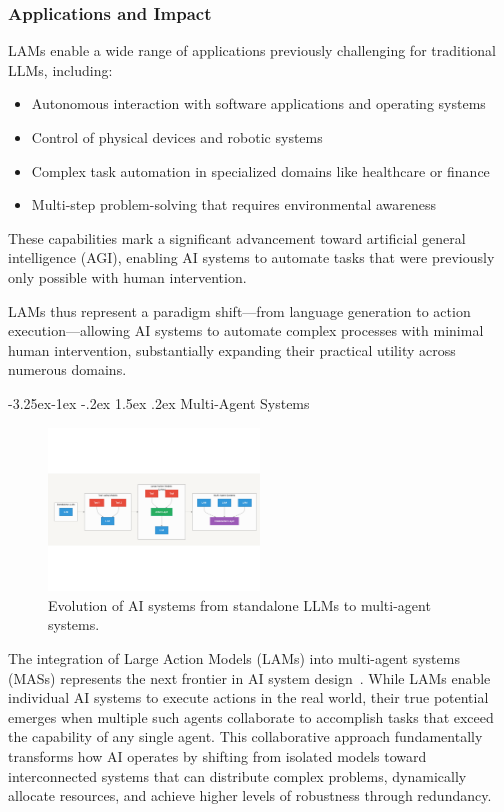 \documentclass[journal,twoside,10pt]{IEEEtran}
\makeatletter
\renewcommand\subsection{\@startsection{subsection}{2}{\z@}%
                       {-3.25ex\@plus -1ex \@minus -.2ex}%
                       {1.5ex \@plus .2ex}%
                       {\normalfont\large\bfseries}}
\makeatother
\begin{document}
\subsubsection{Applications and Impact}
LAMs enable a wide range of applications previously challenging for traditional LLMs, including:

\begin{itemize}
    \item Autonomous interaction with software applications and operating systems
    \item Control of physical devices and robotic systems
    \item Complex task automation in specialized domains like healthcare or finance
    \item Multi-step problem-solving that requires environmental awareness
\end{itemize}

These capabilities mark a significant advancement toward artificial general intelligence (AGI), enabling AI systems to automate tasks that were previously only possible with human intervention.

LAMs thus represent a paradigm shift—from language generation to action execution—allowing AI systems to automate complex processes with minimal human intervention, substantially expanding their practical utility across numerous domains.

\subsection{Multi-Agent Systems}

\begin{figure}[htbp]
    \centering
    \includegraphics[width=0.5\textwidth, trim=0 150pt 0 150pt, clip]{lams_diagram.pdf}
    \caption{Evolution of AI systems from standalone LLMs to multi-agent systems.}
    \label{fig:lam-evolution}
\end{figure}

The integration of Large Action Models (LAMs) into multi-agent systems (MASs) represents the next frontier in AI system design~\cite{tran2025multiagent}. While LAMs enable individual AI systems to execute actions in the real world, their true potential emerges when multiple such agents collaborate to accomplish tasks that exceed the capability of any single agent. This collaborative approach fundamentally transforms how AI operates by shifting from isolated models toward interconnected systems that can distribute complex problems, dynamically allocate resources, and achieve higher levels of robustness through redundancy.
\end{document}
